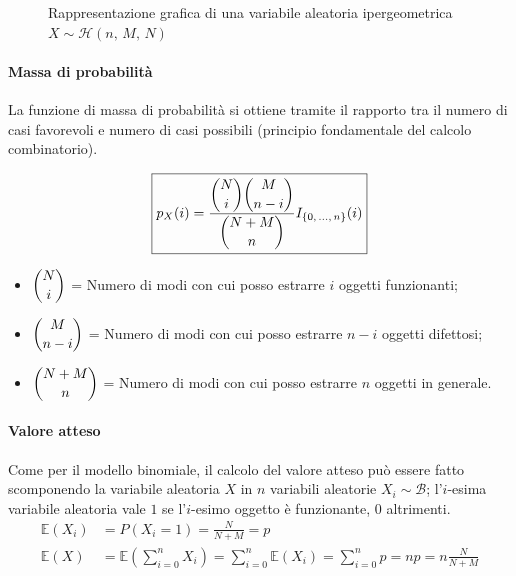 \begin{figure}[h]
    \centering
{}
    \caption{Rappresentazione grafica di una variabile aleatoria ipergeometrica $X \sim \mathcal H{(n, \, M, \, N)}$}
    \label{fig:mod_hyp}
    \vspace{\abovedisplayskip}
\end{figure}

\paragraph{Massa di probabilità} La funzione di massa di probabilità si ottiene tramite il rapporto tra il numero di casi favorevoli e numero di casi possibili (principio fondamentale del calcolo combinatorio).

\[
\boxed{
p_X(i) = \frac{\dbinom{N}{i} \dbinom{M}{n-i}}{\dbinom{N+M}{n}} I_{\{0, \, \dots, \, n \}}(i)
}
\]

\begin{itemize}
    \item $\dbinom{N}{i}$ = Numero di modi con cui posso estrarre $i$ oggetti funzionanti;
    \item $\dbinom{M}{n-i}$ = Numero di modi con cui posso estrarre $n - i$ oggetti difettosi;
    \item $\dbinom{N+M}{n}$ = Numero di modi con cui posso estrarre $n$ oggetti in generale.
\end{itemize}

\paragraph{Valore atteso}
Come per il modello binomiale, il calcolo del valore atteso può essere fatto scomponendo la variabile aleatoria $X$ in $n$ variabili aleatorie $X_i \sim \mathcal B$; l'$i$-esima variabile aleatoria vale $1$ se l'$i$-esimo oggetto è funzionante, $0$ altrimenti.
\begin{align*}
    \mathbb{E}(X_i) &= P(X_i = 1) = \frac{N}{N + M} = p \\
    \mathbb{E}(X) &= \mathbb{E}\left(\sum_{i=0}^n X_i\right) = \sum_{i=0}^n \mathbb{E}(X_i) = \sum_{i=0}^n p = np = n \frac{N}{N + M}
\end{align*}

